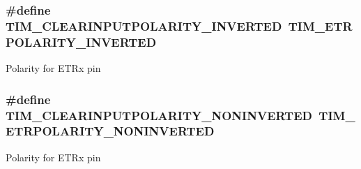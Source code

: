 \subsubsection[{\texorpdfstring{T\+I\+M\+\_\+\+C\+L\+E\+A\+R\+I\+N\+P\+U\+T\+P\+O\+L\+A\+R\+I\+T\+Y\+\_\+\+I\+N\+V\+E\+R\+T\+ED}{TIM_CLEARINPUTPOLARITY_INVERTED}}]{\setlength{\rightskip}{0pt plus 5cm}\#define T\+I\+M\+\_\+\+C\+L\+E\+A\+R\+I\+N\+P\+U\+T\+P\+O\+L\+A\+R\+I\+T\+Y\+\_\+\+I\+N\+V\+E\+R\+T\+ED~{\bf T\+I\+M\+\_\+\+E\+T\+R\+P\+O\+L\+A\+R\+I\+T\+Y\+\_\+\+I\+N\+V\+E\+R\+T\+ED}}\hypertarget{group___t_i_m___clear_input___polarity_ga02e0d10a2cf90016d1a8be1931c6c67e}{}\label{group___t_i_m___clear_input___polarity_ga02e0d10a2cf90016d1a8be1931c6c67e}
Polarity for E\+T\+Rx pin 
\subsubsection[{\texorpdfstring{T\+I\+M\+\_\+\+C\+L\+E\+A\+R\+I\+N\+P\+U\+T\+P\+O\+L\+A\+R\+I\+T\+Y\+\_\+\+N\+O\+N\+I\+N\+V\+E\+R\+T\+ED}{TIM_CLEARINPUTPOLARITY_NONINVERTED}}]{\setlength{\rightskip}{0pt plus 5cm}\#define T\+I\+M\+\_\+\+C\+L\+E\+A\+R\+I\+N\+P\+U\+T\+P\+O\+L\+A\+R\+I\+T\+Y\+\_\+\+N\+O\+N\+I\+N\+V\+E\+R\+T\+ED~{\bf T\+I\+M\+\_\+\+E\+T\+R\+P\+O\+L\+A\+R\+I\+T\+Y\+\_\+\+N\+O\+N\+I\+N\+V\+E\+R\+T\+ED}}\hypertarget{group___t_i_m___clear_input___polarity_ga53e02f7692e6996389b462219572f2a9}{}\label{group___t_i_m___clear_input___polarity_ga53e02f7692e6996389b462219572f2a9}
Polarity for E\+T\+Rx pin 
